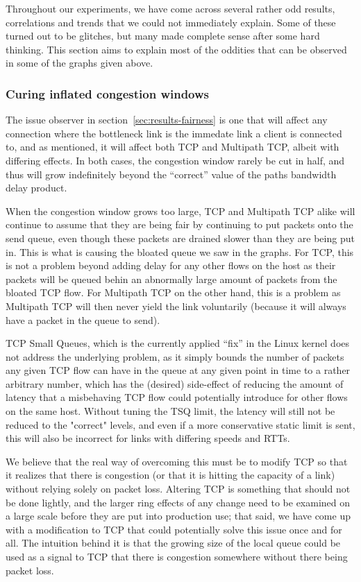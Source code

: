Throughout our experiments, we have come across several rather odd results,
correlations and trends that we could not immediately explain. Some of these
turned out to be glitches, but many made complete sense after some hard
thinking. This section aims to explain most of the oddities that can be observed
in some of the graphs given above.

\subsubsection{Curing inflated congestion windows}
The issue observer in section~\ref{sec:results-fairness} is one that will affect
any connection where the bottleneck link is the immedate link a client is
connected to, and as mentioned, it will affect both TCP and Multipath TCP,
albeit with differing effects. In both cases, the congestion window rarely be
cut in half, and thus will grow indefinitely beyond the ``correct'' value of the
paths bandwidth delay product.

When the congestion window grows too large, TCP and Multipath TCP alike will
continue to assume that they are being fair by continuing to put packets onto
the send queue, even though these packets are drained slower than they are being
put in. This is what is causing the bloated queue we saw in the graphs. For TCP,
this is not a problem beyond adding delay for any other flows on the host as
their packets will be queued behin an abnormally large amount of packets from
the bloated TCP flow. For Multipath TCP on the other hand, this is a problem as
Multipath TCP will then never yield the link voluntarily (because it will always
have a packet in the queue to send).

TCP Small Queues, which is the currently applied ``fix'' in the Linux kernel
does not address the underlying problem, as it simply bounds the number of
packets any given TCP flow can have in the queue at any given point in time to a
rather arbitrary number, which has the (desired) side-effect of reducing the
amount of latency that a misbehaving TCP flow could potentially introduce for
other flows on the same host. Without tuning the TSQ limit, the latency will
still not be reduced to the "correct" levels, and even if a more conservative
static limit is sent, this will also be incorrect for links with differing
speeds and RTTs.

We believe that the real way of overcoming this must be to modify TCP so that it
realizes that there is congestion (or that it is hitting the capacity of a link)
without relying solely on packet loss. Altering TCP is something that should not
be done lightly, and the larger ring effects of any change need to be examined
on a large scale before they are put into production use; that said, we have
come up with a modification to TCP that could potentially solve this issue once
and for all. The intuition behind it is that the growing size of the local queue
could be used as a signal to TCP that there is congestion somewhere without
there being packet loss.

